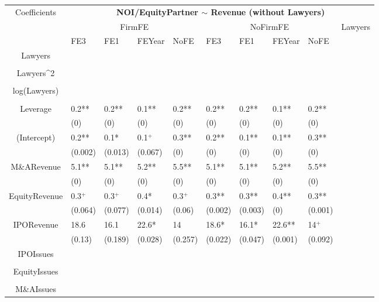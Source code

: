 \documentclass{article}
\begin{document}
\begin{table}[H]
\centering
\begin{tabular}{|clllllllll|}
\hline
\multirow{3}{*}{Coefficients} & \multicolumn{9}{c|}{\textbf{NOI/EquityPartner $\sim$ Revenue (without Lawyers)}} \\
\cline{2-10}
& \multicolumn{4}{c}{FirmFE} & \multicolumn{4}{c}{NoFirmFE} & \multirow{2}{*}{Lawyers} \\
\cline{2-9}
& FE3 & FE1 & FEYear & NoFE & FE3 & FE1 & FEYear & NoFE &  \\
\hline
 
Lawyers &  &  &  &  &  &  &  &  & \\ 
   &  &  &  &  &  &  &  &  & \\ 
  Lawyers^2 &  &  &  &  &  &  &  &  & \\ 
   &  &  &  &  &  &  &  &  & \\ 
  log(Lawyers) &  &  &  &  &  &  &  &  & \\ 
   &  &  &  &  &  &  &  &  & \\ 
  Leverage & 0.2** & 0.2** & 0.1** & 0.2** & 0.2** & 0.2** & 0.1** & 0.2** & \\ 
   & (0) & (0) & (0) & (0) & (0) & (0) & (0) & (0) & \\ 
  (Intercept) & 0.2** & 0.1* & 0.1$^{+}$ & 0.3** & 0.2** & 0.1** & 0.1** & 0.3** & \\ 
   & (0.002) & (0.013) & (0.067) & (0) & (0) & (0) & (0) & (0) & \\ 
  M\&ARevenue & 5.1** & 5.1** & 5.2** & 5.5** & 5.1** & 5.1** & 5.2** & 5.5** & \\ 
   & (0) & (0) & (0) & (0) & (0) & (0) & (0) & (0) & \\ 
  EquityRevenue & 0.3$^{+}$ & 0.3$^{+}$ & 0.4* & 0.3$^{+}$ & 0.3** & 0.3** & 0.4** & 0.3** & \\ 
   & (0.064) & (0.077) & (0.014) & (0.06) & (0.002) & (0.003) & (0) & (0.001) & \\ 
  IPORevenue & 18.6 & 16.1 & 22.6* & 14 & 18.6* & 16.1* & 22.6** & 14$^{+}$ & \\ 
   & (0.13) & (0.189) & (0.028) & (0.257) & (0.022) & (0.047) & (0.001) & (0.092) & \\ 
  IPOIssues &  &  &  &  &  &  &  &  & \\ 
   &  &  &  &  &  &  &  &  & \\ 
  EquityIssues &  &  &  &  &  &  &  &  & \\ 
   &  &  &  &  &  &  &  &  & \\ 
  M\&AIssues &  &  &  &  &  &  &  &  & \\ 

\end{tabular}
\end{table}
\end{document}
